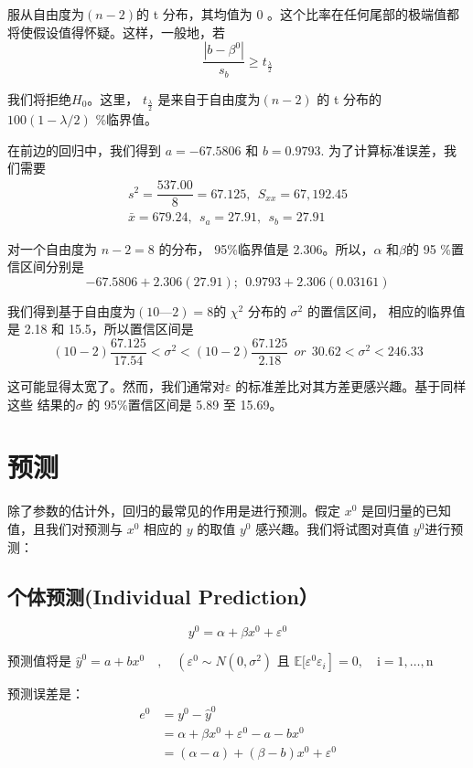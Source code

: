 服从自由度为$(n - 2)$的 t 分布，其均值为 0 。这个比率在任何尾部的极端值都将使假设值得怀疑。这样，一般地，若
$$ \frac{\left|b-\beta^{0}\right|}{s_{b}} \geq t_{\frac{\lambda}{2}} $$

我们将拒绝$ H_{0} $。这里， $t_{\frac{\lambda}{2}}  $ 是来自于自由度为$(n - 2)$ 的 t 分布的 $ 100(1 - \lambda /2)$ \%临界值。 
\begin{myexample}
    在前边的回归中，我们得到 $ a = - 67.5806 $ 和 $ b = 0.9793$. 为了计算标准误差，我们需要
$$    \begin{array}{c}
        s^{2}=\dfrac{537.00}{8}=67.125  , \ \ S_{x x}=67,192.45 \\
        \bar{x}=679.24 ,\ \  s_{a}=27.91 , \ \ s_{b}=27.91
    \end{array} $$

    对一个自由度为 $ n - 2 = 8 $ 的分布， 95\%临界值是 2.306。所以，$ \alpha $ 和$  \beta $的 95 \%置信区间分别是
$$ - 67.5806 + 2.306(27.91 ) ; \ \  0.9793+2.306 (0.03161) $$ 

我们得到基于自由度为$ (10—2)  =8 $的 $\chi^{2}$ 分布的 $ \sigma^{2} $ 的置信区间， 相应的临界值是 2.18 和 15.5，所以置信区间是
$$ (10-2) \frac{67.125}{17.54}<\sigma^{2}<(10-2) \frac{67.125}{2.18} \ \ or \ \  30.62<\sigma^{2}<246.33 $$

这可能显得太宽了。然而，我们通常对$ \varepsilon $  的标准差比对其方差更感兴趣。基于同样这些 结果的$ \sigma $ 的 95\%置信区间是 5.89 至 15.69。
\end{myexample}

\section{预测}
除了参数的估计外，回归的最常见的作用是进行预测。假定 $x^{0}$ 是回归量的已知值，且我们对预测与 $x^{0}$ 相应的 $y$ 的取值 $y^{0}$ 感兴趣。我们将试图对真值 $ y^{0} $进行预测：

\subsection{个体预测(Individual Prediction）}
$$y^{0}=\alpha+\beta x^{0}+\varepsilon^{0}$$

预测值将是 $\hat{y}^{0}=a+b x^{0} \quad, \quad\left(\varepsilon^{0} \sim N\left(0, \sigma^{2}\right)\right.$
且 $\left.\mathbb{E} [ \varepsilon^{0} \varepsilon_{i} \right ] =0, \quad \mathrm{i}=1, \ldots, \mathrm{n}$

预测误差是：
$$ \begin{aligned}
e^{0} &=y^{0}-\hat{y}^{0} \\
&=\alpha+\beta x^{0}+\varepsilon^{0}-a-b x^{0} \\
&=(\alpha-a)+(\beta-b) x^{0}+\varepsilon^{0}
\end{aligned} $$

